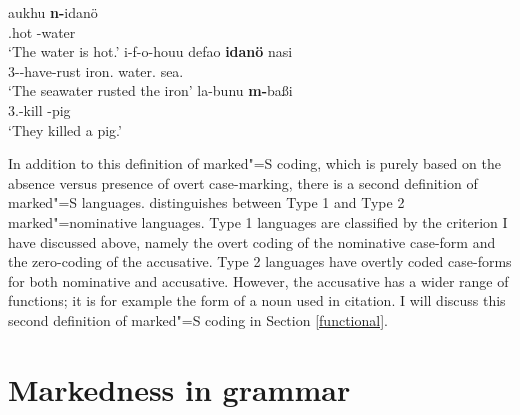 \begin{exe}\ex\label{Nias}
\begin{xlist} 
\ex\label{NiasS}\gll aukhu \textbf{n-}idan\"o\\
{\stat}.hot {\abs}-water\\
\glt `The water is hot.'
\ex\label{NiasAP}\gll i-f-o-houu	defao 	\textbf{idan\"o} 	nasi\\
3\sg{}-\caus{}-have-rust	iron.\abs{}	water.\erg{}	sea.\abs{}\\
\glt `The seawater rusted the iron'
\ex\label{NiasP}\gll  la-bunu \textbf{m-}ba\ss i\\
3\pl{}.{\rls}-kill \abs{}-pig\\
\glt `They killed a pig.'
\end{xlist}
\end{exe}

In addition to this definition of marked"=S coding, which is purely based on the absence versus presence of overt case-marking, there is a second definition of marked"=S languages. \citet{Koenig:2006} distinguishes between Type 1 and Type 2 marked"=nominative languages. 
Type 1 languages are classified by the criterion I have discussed above, namely the overt coding of the nominative case-form and the zero-coding of the accusative. 
Type 2 languages have overtly coded case-forms for both nominative and accusative. 
However, the accusative has a wider range of functions; it is for example the form of a noun used in citation. 
I will discuss this second definition of marked"=S coding in Section \ref{functional}.


\section{Markedness in grammar}\label{markedness}

